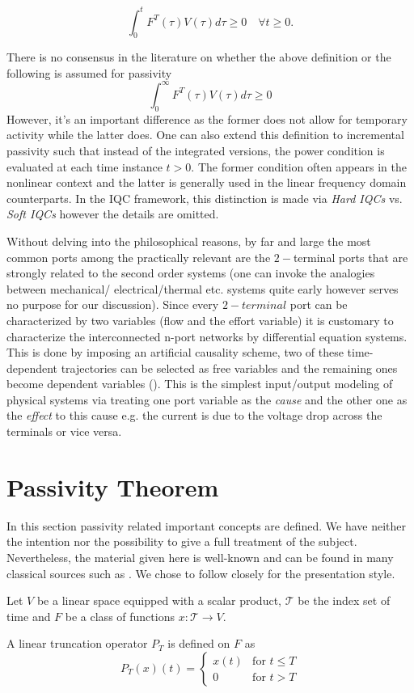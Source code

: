 \[
\int^t_0 F^T(\tau)V(\tau)d\tau \geq 0 \quad \forall t\geq 0.
\]
\begin{rem}There is no consensus in the literature on whether the above definition or the following is assumed for passivity
\[
\int^\infty_0 F^T(\tau)V(\tau)d\tau \geq 0
\]
However, it's an important difference as the former does not allow for temporary activity while the latter does. One can also extend
this definition to incremental passivity such that instead of the integrated versions, the power condition is evaluated at each time 
instance $t>0$. The former condition often appears in the nonlinear context and the latter is generally used in the linear frequency 
domain counterparts. In the IQC framework, this distinction is made via \emph{Hard IQCs} vs. \emph{Soft IQCs} however the details 
are omitted.
\end{rem}
Without delving into the philosophical reasons, by far and large the most common ports among the practically relevant are the 
$2-$terminal ports that are strongly related to the second order systems (one can invoke the analogies between mechanical/%
electrical/thermal etc. systems quite early however serves no purpose for our discussion).  Since every $2-terminal$ port
can be characterized by two variables (flow and the effort variable) it is customary to characterize the interconnected
n-port networks by differential equation systems. This is done by imposing an artificial causality scheme, 
two of these time-dependent trajectories can be selected as free variables and the remaining ones become dependent variables 
(\cite{behavbook}). This is the simplest input/output modeling of physical systems via treating one port variable as the 
\emph{cause} and the other one as the \emph{effect} to this cause e.g. the current is due to the voltage drop across the terminals or 
vice versa. 

\section{Passivity Theorem}
In this section passivity related important concepts are defined. We have neither the intention nor the possibility to give a full 
treatment of the subject. Nevertheless, the material given here is well-known and can be found in many classical sources such as
\cite{hillmoylan77,desvid,vdschaftbook}. We chose to follow closely \cite{desvid} for the presentation style. 

Let $V$ be a linear space equipped with a scalar product, $\mathcal{T}$ be the index set of time and $F$ be a class of functions 
$x:\mathcal{T}\to V$.
\begin{define} A linear truncation operator $P_T$ is defined on $F$ as 
\begin{equation}
P_T(x)(t) = \begin{cases} x(t) &\text{for } t\leq T\\ 0 &\text{for } t>T\end{cases}
\label{eq:apdx:trunc}
\end{equation}
\end{define}

